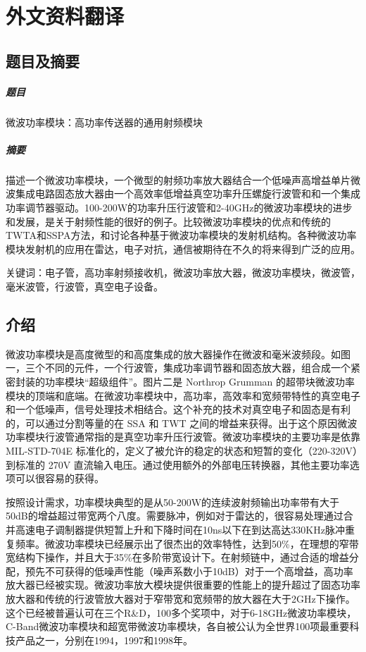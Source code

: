 
\chapter{外文资料翻译}

\section{题目及摘要}

\paragraph{题目} 微波功率模块：高功率传送器的通用射频模块

\paragraph{摘要} 描述一个微波功率模块，一个微型的射频功率放大器结合一个低噪声高增益单片微波集成电路固态放大器由一个高效率低增益真空功率升压螺旋行波管和和一个集成功率调节器驱动。100-200W的功率升压行波管和2-40GHz的微波功率模块的进步和发展，是关于射频性能的很好的例子。比较微波功率模块的优点和传统的TWTA和SSPA方法，和讨论各种基于微波功率模块的发射机结构。各种微波功率模块发射机的应用在雷达，电子对抗，通信被期待在不久的将来得到广泛的应用。

关键词：电子管，高功率射频接收机，微波功率放大器，微波功率模块，微波管，毫米波管，行波管，真空电子设备。

\section{介绍}

微波功率模块是高度微型的和高度集成的放大器操作在微波和毫米波频段。如图一，三个不同的元件，一个行波管，集成功率调节器和固态放大器，组合成一个紧密封装的功率模块“超级组件”。图片二是 Northrop Grumman 的超带块微波功率模块的顶端和底端。在微波功率模块中，高功率，高效率和宽频带特性的真空电子和一个低噪声，信号处理技术相结合。这个补充的技术对真空电子和固态是有利的，可以通过分割等量的在 SSA 和 TWT 之间的增益来获得。出于这个原因微波功率模块行波管通常指的是真空功率升压行波管。微波功率模块的主要功率是依靠 MIL-STD-704E 标准化的，定义了被允许的稳定的状态和短暂的变化（220-320V）到标准的 270V 直流输入电压。通过使用额外的外部电压转换器，其他主要功率选项可以很容易的获得。

按照设计需求，功率模块典型的是从50-200W的连续波射频输出功率带有大于50dB的增益超过带宽两个八度。需要脉冲，例如对于雷达的，很容易处理通过合并高速电子调制器提供短暂上升和下降时间在10ns以下在到达高达330KHz脉冲重复频率。微波功率模块已经展示出了很杰出的效率特性，达到50\%，在理想的窄带宽结构下操作，并且大于35\%在多阶带宽设计下。在射频链中，通过合适的增益分配，预先不可获得的低噪声性能（噪声系数小于10dB）对于一个高增益，高功率放大器已经被实现。微波功率放大模块提供很重要的性能上的提升超过了固态功率放大器和传统的行波管放大器对于窄带宽和宽频带的放大器在大于2GHz下操作。这个已经被普遍认可在三个R\&D，100多个奖项中，对于6-18GHz微波功率模块，C-Band微波功率模块和超宽带微波功率模块，各自被公认为全世界100项最重要科技产品之一，分别在1994，1997和1998年。

